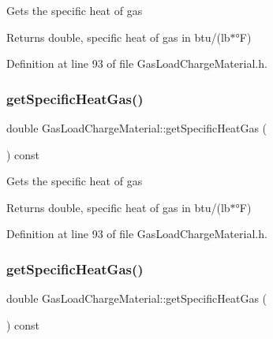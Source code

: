 Gets the specific heat of gas

\begin{DoxyReturn}{Returns}
double, specific heat of gas in btu/(lb$\ast$°F) 
\end{DoxyReturn}


Definition at line 93 of file Gas\+Load\+Charge\+Material.\+h.

\mbox{\label{class_gas_load_charge_material_a66e956e7a52b1032a3e8a725f26fa580}} 
\subsubsection{\texorpdfstring{get\+Specific\+Heat\+Gas()}{getSpecificHeatGas()}\hspace{0.1cm}{\footnotesize\ttfamily [2/3]}}
{\footnotesize\ttfamily double Gas\+Load\+Charge\+Material\+::get\+Specific\+Heat\+Gas (\begin{DoxyParamCaption}{ }\end{DoxyParamCaption}) const\hspace{0.3cm}{\ttfamily [inline]}}

Gets the specific heat of gas

\begin{DoxyReturn}{Returns}
double, specific heat of gas in btu/(lb$\ast$°F) 
\end{DoxyReturn}


Definition at line 93 of file Gas\+Load\+Charge\+Material.\+h.

\mbox{\label{class_gas_load_charge_material_a66e956e7a52b1032a3e8a725f26fa580}} 
\subsubsection{\texorpdfstring{get\+Specific\+Heat\+Gas()}{getSpecificHeatGas()}\hspace{0.1cm}{\footnotesize\ttfamily [3/3]}}
{\footnotesize\ttfamily double Gas\+Load\+Charge\+Material\+::get\+Specific\+Heat\+Gas (\begin{DoxyParamCaption}{ }\end{DoxyParamCaption}) const\hspace{0.3cm}{\ttfamily [inline]}}

